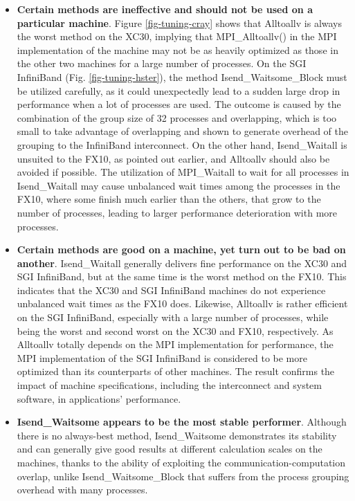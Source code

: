 \begin{itemize}
\item
\textbf{Certain methods are ineffective and should not be used on a particular machine}. Figure \ref{fig-tuning-cray} shows that Alltoallv is always the worst method on the XC30, implying that MPI\_Alltoallv() in the MPI implementation of the machine may not be as heavily optimized as those in the other two machines for a large number of processes. On the SGI InfiniBand (Fig. \ref{fig-tuning-hster}), the method Isend\_Waitsome\_Block must be utilized carefully, as it could unexpectedly lead to a sudden large drop in performance when a lot of processes are used. The outcome is caused by the combination of the group size of 32 processes and overlapping, which is too small to take advantage of overlapping and shown to generate overhead of the grouping to the InfiniBand interconnect. On the other hand, Isend\_Waitall is unsuited to the FX10, as pointed out earlier, and Alltoallv should also be avoided if possible. The utilization of MPI\_Waitall to wait for all processes in Isend\_Waitall may cause unbalanced wait times among the processes in the FX10, where some finish much earlier than the others, that grow to the number of processes, leading to larger performance deterioration with more processes.  
\item
\textbf{Certain methods are good on a machine, yet turn out to be bad on another}. Isend\_Waitall generally delivers fine performance on the XC30 and SGI InfiniBand, but at the same time is the worst method on the FX10. This indicates that the XC30 and SGI InfiniBand machines do not experience unbalanced wait times as the FX10 does. Likewise, Alltoallv is rather efficient on the SGI InfiniBand, especially with a large number of processes, while being the worst and second worst on the XC30 and FX10, respectively. As Alltoallv totally depends on the MPI implementation for performance, the MPI implementation of the SGI InfiniBand is considered to be more optimized than its counterparts of other machines. The result confirms the impact of machine specifications, including the interconnect and system software, in applications' performance.
\item
\textbf{Isend\_Waitsome appears to be the most stable performer}. Although there is no always-best method, Isend\_Waitsome demonstrates its stability and can generally give good results at different calculation scales on the machines, thanks to the ability of exploiting the communication-computation overlap, unlike Isend\_Waitsome\_Block that suffers from the process grouping overhead with many processes.  

\end{itemize}


